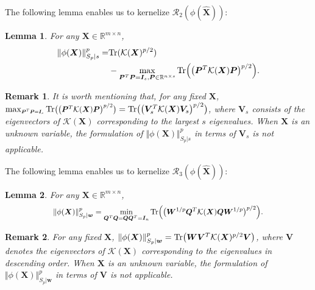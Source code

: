 \documentclass[letterpaper]{article} %
\newtheorem{lemma}{Lemma}
\newtheorem{remark}{Remark}
\begin{document}
The following lemma enables us to kernelize $\mathcal{R}_2(\phi(\hat{\bm{X}}))$:
\begin{lemma}\label{lem_ts}
For any $\bm{X}\in\mathbb{R}^{m\times n}$,
\begin{equation*}
\begin{aligned}
\Vert \phi(\bm{X})\Vert_{S_p\vert s}^p=&\textup{Tr}(\mathcal{K}(\bm{X})^{p/2})\\
&-\max_{\bm{P}^T\bm{P}=\bm{I}_s,\bm{P}\in\mathbb{R}^{n\times s}}\textup{Tr}\Big(\big(\bm{P}^T\mathcal{K}(\bm{X})\bm{P}\big)^{p/2}\Big).
\end{aligned}
\end{equation*}
\end{lemma}
\begin{remark}
\textup{It is worth mentioning that, for any fixed $\bm{X}$, $\max_{\scaleobj{0.8}{\bm{P}^T\bm{P}=\bm{I}_s}}\textup{Tr}\scaleobj{0.9}{\big(\big(\bm{P}^T\mathcal{K}(\bm{X})\bm{P}\big)^{p/2}\big)}=\textup{Tr}\big(\big(\bm{V}_s^T\mathcal{K}(\bm{X})\bm{V}_s\big)^{p/2}\big)$, where $\bm{V}_s$ consists of the eigenvectors of $\mathcal{K}(\bm{X})$ corresponding to the largest $s$ eigenvalues. When $\bm{X}$ is an unknown variable, the formulation of $\Vert \phi(\bm{X})\Vert_{S_p\vert s}^p$ in terms of $\bm{V}_s$ is not applicable.}
\end{remark}


The following lemma enables us to kernelize $\mathcal{R}_3(\phi(\hat{\bm{X}}))$:
\begin{lemma}\label{lem_ws}
For any $\bm{X}\in\mathbb{R}^{m\times n}$,
$$
\scaleobj{0.9}{\Vert \phi(\bm{X})\Vert_{S_p\vert \bm{w}}^p=\min_{\bm{Q}^T\bm{Q}=\bm{Q}\bm{Q}^T=\bm{I}_n}\textup{Tr}\Big(\big(\bm{W}^{1/p}\bm{Q}^T\mathcal{K}(\bm{X})\bm{Q}\bm{W}^{1/p}\big)^{p/2}\Big)}.
$$
\end{lemma}
\begin{remark}
\textup{For any fixed $\bm{X}$, $\Vert \phi(\bm{X})\Vert_{S_p\vert \bm{w}}^p=\textup{Tr}\big(\bm{W}\bm{V}^T\mathcal{K}(\bm{X})^{p/2}\bm{V}\big)$, where $\bm{V}$ denotes the eigenvectors of $\mathcal{K}(\bm{X})$ corresponding to the eigenvalues in descending order. When $\bm{X}$ is an unknown variable, the formulation of $\Vert \phi(\bm{X})\Vert_{S_p\vert \bm{w}}^p$ in terms of $\bm{V}$ is not applicable.}
\end{remark}
\end{document}
